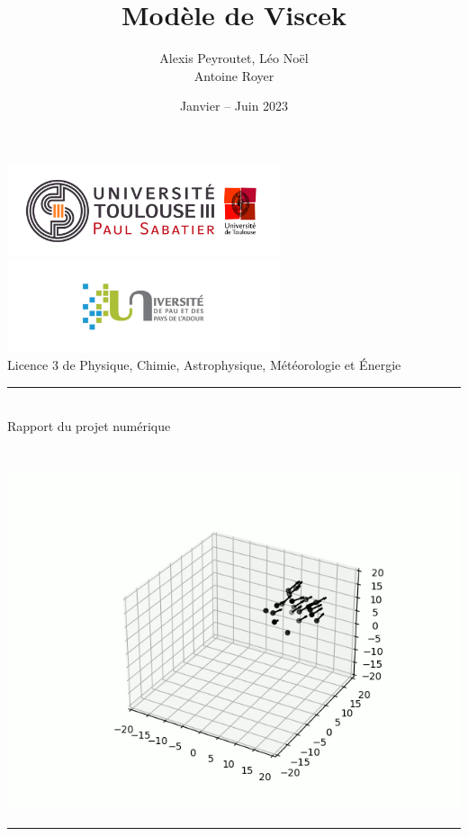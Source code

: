 \documentclass[french, a4paper, 12pt, openany]{report}
\title{\sc Modèle de Viscek}
\author{Alexis Peyroutet, Léo Noël\\Antoine Royer}
\date{Janvier – Juin 2023}
\begin{document}
\makeatletter
\begin{titlepage}
	\centering
	
	\includegraphics[width=8cm]{images/ut3.png} \hfill \includegraphics[width=8cm]{images/uppa.png} \\
	{\large{\sc Licence 3 de Physique, Chimie, Astrophysique, Météorologie et Énergie}} \\
	\rule{0.5\linewidth}{0.4pt} \\
	{\sc Rapport du projet numérique} \\
	
	
	\vfill
	{\huge {\sc \@title}} \\ \vspace{1cm}
	{\Large \@author} \\
	
	\vfill 
	\includegraphics[width=0.7\linewidth]{images/page_garde2.png}
	\vfill
	{\Large \@date}
	\rule{\linewidth}{0.4pt}
\end{titlepage}
\makeatother

\tableofcontents

\end{document}

